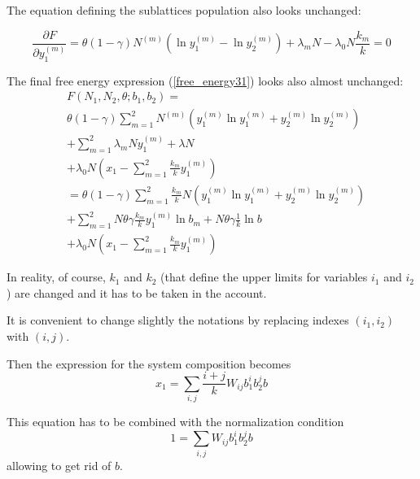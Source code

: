 \documentclass[12pt,abstract]{scrartcl}
\begin{document}
The equation defining the sublattices population also looks unchanged:

\begin{equation} \label{dFdy}
\frac{\partial F}{\partial y_1^{(m)}}  =
\theta(1- \gamma) N^{(m)} ( \ln y_1^{(m)} - \ln y_2^{(m)}) + \lambda_m N - \lambda_0 N \frac{k_m}{k} = 0
\end{equation} 

The final free energy expression (\ref{free_energy31}) looks also almost unchanged:
\begin{equation} \label{free_energy42}
\begin{split}
&F(N_1, N_2, \theta; b_1, b_2 )=  \\
& \theta(1- \gamma) \sum_{m = 1}^2  N^{(m)} ( y_1^{(m)} \ln y_1^{(m)} + y_2^{(m)} \ln y_2^{(m)} )\\
&+ \sum_{m=1}^2 \lambda_m Ny_1^{(m)} + \lambda N \\
&+ \lambda_0 N \left(x_1 - \sum_{m=1}^2 \frac{k_m}{k} y_1^{(m)} \right)\\
&=  \theta(1- \gamma) \sum_{m = 1}^2 \frac{k_m}{k} N  ( y_1^{(m)} \ln y_1^{(m)} + y_2^{(m)} \ln y_2^{(m)} )\\
&+ \sum_{m=1}^2 N \theta \gamma \frac{k_m}{k} y_1^{(m)}\ln b_m + N \theta \gamma \frac{1}{k} \ln b\\
&+ \lambda_0 N \left(x_1 - \sum_{m=1}^2 \frac{k_m}{k} y_1^{(m)} \right)
\end{split}
\end{equation}

In reality, of course, $k_1$ and $k_2$ (that define the upper limits for variables $i_1$ and $i_2$) are changed and it has to be taken in the account.








It is convenient to change slightly the notations  by  replacing indexes $(i_1, i_2)$ with $(i, j)$.

Then the expression for the system composition becomes
\begin{equation} \label{x14}
x_1 = \sum_{i, j} \frac{i + j}{k} W_{i j} b_1^i b_2^j b
\end{equation}

This equation has to be combined with the normalization condition
\begin{equation} \label{p4}
1 = \sum_{i, j}  W_{i j} b_1^i b_2^j b
\end{equation}
allowing to get rid of $b$.
\end{document}
